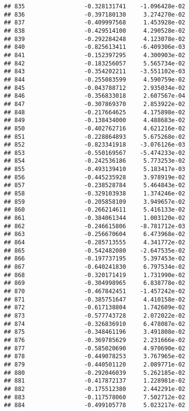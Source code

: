 \documentclass[
]{article}
\begin{document}
\begin{verbatim}
## 835                 -0.328131741    -1.096428e-02
## 836                 -0.397180130     3.274270e-02
## 837                 -0.409997568     1.453928e-02
## 838                 -0.429514100     4.290528e-02
## 839                 -0.292284248     4.123078e-02
## 840                 -0.825613411    -6.409306e-03
## 841                 -0.152397295     4.300903e-02
## 842                 -0.183256057     5.565734e-02
## 843                 -0.354202211    -3.551102e-03
## 844                 -0.255083599     4.590759e-02
## 845                 -0.043788712     2.935034e-02
## 846                 -0.356833018     2.607567e-04
## 847                 -0.307869370     2.853922e-02
## 848                 -0.217664625     4.175898e-02
## 849                 -0.138434000     4.488683e-02
## 850                 -0.402762716     4.621216e-02
## 851                 -0.228864893     5.675268e-02
## 852                 -0.823341918    -3.076126e-03
## 853                 -0.550169567    -5.474233e-02
## 854                 -0.242536186     5.773253e-02
## 855                 -0.493139410     5.183417e-03
## 856                 -0.445235928     3.978919e-02
## 857                 -0.238528784     5.464843e-02
## 858                 -0.329103938     1.374246e-02
## 859                 -0.205858109     3.949657e-02
## 860                 -0.266214611     5.416133e-02
## 861                 -0.384061344     1.003120e-02
## 862                 -0.246615806    -8.781712e-03
## 863                 -0.256670604     6.473968e-02
## 864                 -0.285713555     4.341772e-02
## 865                 -0.542482080    -2.647535e-02
## 866                 -0.197737195     5.397453e-02
## 867                 -0.640241830     6.797534e-02
## 868                 -0.320171419     1.731990e-02
## 869                 -0.304998965     6.838778e-02
## 870                 -0.467842451    -1.457242e-02
## 871                 -0.385751647     4.410158e-02
## 872                 -0.617138804     1.742609e-02
## 873                 -0.577743728     2.072022e-02
## 874                 -0.326836910     6.478087e-02
## 875                 -0.348461196     3.491808e-02
## 876                 -0.369785629     2.231666e-02
## 877                 -0.585020690     4.970690e-02
## 878                 -0.449078253     3.767965e-02
## 879                 -0.440501120     2.089771e-02
## 880                 -0.292046039     5.262185e-02
## 881                 -0.417872137     1.228981e-02
## 882                 -0.175512380     2.442291e-02
## 883                 -0.117578060     7.502712e-02
## 884                 -0.499105778     5.023217e-02

\end{verbatim}
\end{document}
